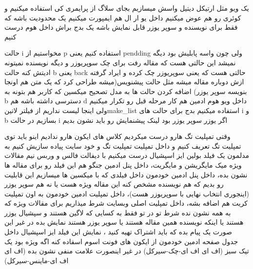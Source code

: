 \documentclass{article}
\begin{document}
			 یک ویو مثل ارتیکل دیتیل واسش میسازیم بجای سلاگ از پرایمری کی استفاده میکنیم و کوئری رو هم عوض میکنیم
			 داخل یو ار ال هم ایمپورت میکنیم
			 یک محدودیت باشه که فقط برای نویسنده و سوپر یوزر قابل نمایش باشه
			 یک بدج براش داخل هوم درست کنیم
			
	
		حالت i مخواستیم از p استفاده کنیم یعنی pendding ولی چون واسه پابلیش بود دیگه نمیشد این حالتی هست که مقاله رفت برای چک سوپریوزر
		و دیگه نویسنده نمیتونه ادیتش کنه حالت b یعنی back حالتی هست که یعنی سوپریوزر چک کرده و ایراد گرفته ازش دوباره مقاله میشه مثل حالت
		پیشنویس(میشه طراحی کرد که یک متن هم اونجا بنویسه سوپر یوزر)
			 اضافه کردن حالت ها به مدل
			 تصحیح میکسین که کاربر هم بتونه به b دسترسی داشته باشه هم d 
			 داخل ویو هوم ادمین هم کار مرحله قبل رو تکرار میکنیم ولی اینجا لیست نداریم از فیلتر ‌لاتین{make\_list} استفاده میکنیم
			 بدج برای حالت های i و b بسازیم 
			 در حالت i اگر یوزر سوپر یوزر بود لینک پیشنمایش رو باید نشون بدیم
		
		 وقتی تمپلیت تگ هارو درست میکردیم کلاس های ایکون هارو ندادیم اینو باید توی تمپلیت تگ تعریف کنیم و داخل تمپلیت
		تمپلیت تگ و خود سایت پیاده سازیش کنیم
			به مدلمون یک فیلد بولین ایز اسپشیال درست میکنیم با دیفالت فالس و وربس نیم مقالات ویژه میک مایگریشن و مایگریت، داخل پنل ادمین
			جنگو هم این فیلد رو برای مقاله ها نشون بده، داخل پنل ادمین خودمون داخل فیلدی که با میکسین ها میسازیم این قابلیت رو بدیم 
			که هم نویسنده مشخص کنه این مقاله ویژه هست یا نه هم سوپر یوزر (اینجوری انتخاب نهایی با سوپریوزر هست)، داخل تمپلیت ادمین
			خودمون به اون تمپلیت کریت هم اضافه بشه، داخل تمپلیت اصلی وبسایت شرط میذاریم برای مقالات ویژه که به همه نشون نده
			شرط تو در تو فقط به کسایی که لاگین هستند و سپشیال یوزر هستند یا اینکه نویسنده همین مقاله هستند یا سوپر یوزر هستند نمایش بده 
			در غیر این صورت یک پیام بده که باید اشتراک تهیه کنید ، نمایش این فیلد ایز اسپشیال داخل جدول صفحه ادمین خودمون از ایکون های 
			فونت اسوم اسفاده کنه اگه ویژه بود یک تیک سبز (اف ای اف ای-چک-سیرکل) در غیر اینصورت علامت منفی نشون بده 
			(اف ای اف ای-ماینس-سیرکل)
\end{document}
